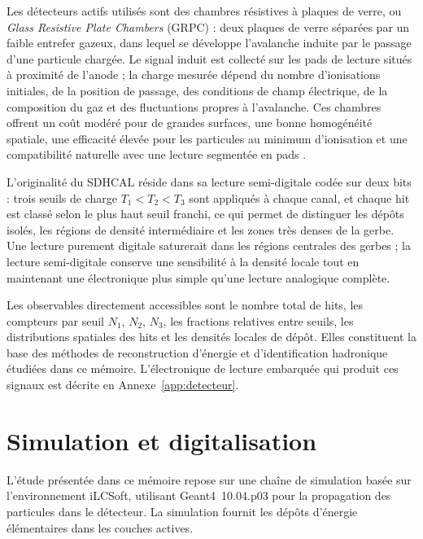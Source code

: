 Les détecteurs actifs utilisés sont des chambres résistives à plaques de verre, ou \emph{Glass Resistive Plate Chambers} (GRPC) \cite{bedjidian2011grpc} : deux plaques de verre séparées par un faible entrefer gazeux, dans lequel se développe l'avalanche induite par le passage d'une particule chargée. Le signal induit est collecté sur les pads de lecture situés à proximité de l'anode ; la charge mesurée dépend du nombre d'ionisations initiales, de la position de passage, des conditions de champ électrique, de la composition du gaz et des fluctuations propres à l'avalanche. Ces chambres offrent un coût modéré pour de grandes surfaces, une bonne homogénéité spatiale, une efficacité élevée pour les particules au minimum d'ionisation et une compatibilité naturelle avec une lecture segmentée en pads \cite{bedjidian2011grpc, calice2022sdhcal}.

L'originalité du SDHCAL réside dans sa lecture semi-digitale codée sur deux bits : trois seuils de charge \(T_1 < T_2 < T_3\) sont appliqués à chaque canal, et chaque hit est classé selon le plus haut seuil franchi, ce qui permet de distinguer les dépôts isolés, les régions de densité intermédiaire et les zones très denses de la gerbe. Une lecture purement digitale saturerait dans les régions centrales des gerbes ; la lecture semi-digitale conserve une sensibilité à la densité locale tout en maintenant une électronique plus simple qu'une lecture analogique complète.

Les observables directement accessibles sont le nombre total de hits, les compteurs par seuil \(N_1\), \(N_2\), \(N_3\), les fractions relatives entre seuils, les distributions spatiales des hits et les densités locales de dépôt. Elles constituent la base des méthodes de reconstruction d'énergie et d'identification hadronique étudiées dans ce mémoire. L'électronique de lecture embarquée qui produit ces signaux est décrite en Annexe~\ref{app:detecteur}.

\section{Simulation et digitalisation}

L'étude présentée dans ce mémoire repose sur une chaîne de simulation basée sur l'environnement iLCSoft, utilisant Geant4~10.04.p03 \cite{geant4, geant4update} pour la propagation des particules dans le détecteur. La simulation fournit les dépôts d'énergie élémentaires dans les couches actives.

